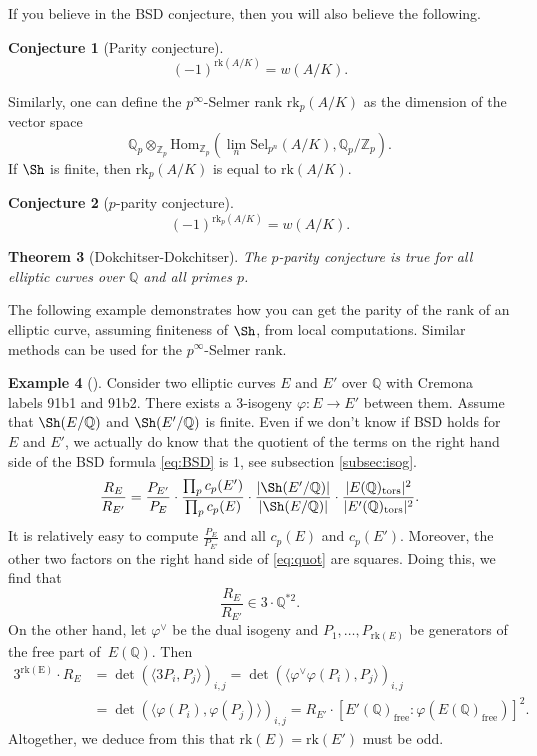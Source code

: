 \documentclass[12pt]{article}
\newtheorem{theorem}{Theorem}[section]
\newtheorem{conjecture}[theorem]{Conjecture}
\theoremstyle{definition}
\newtheorem{example}[theorem]{Example}
\numberwithin{equation}{subsection}
\newcommand{\Q}{\ensuremath{\mathbb{Q}}}
\newcommand{\Z}{\ensuremath{\mathbb{Z}}}
\begin{document}
If you believe in the BSD conjecture, then you will also believe the following.

\begin{conjecture}[Parity conjecture]
$$(-1)^{\mathrm{rk}(A/K)} = w(A/K).$$
\end{conjecture}

Similarly, one can define the $p^\infty$-Selmer rank $\mathrm{rk}_p(A/K)$ as the dimension of the vector space
$$ \Q_p \otimes_{\Z_p} \mathrm{Hom}_{\Z_p}\!\left( \lim_n \mathrm{Sel}_{p^n}(A/K), \Q_p/ \Z_p \right).$$
If $\Sh$ is finite, then $\mathrm{rk}_p(A/K)$ is equal to $\mathrm{rk}(A/K)$.

\begin{conjecture}[$p$-parity conjecture]
$$(-1)^{\mathrm{rk}_p(A/K)} = w(A/K).$$
\end{conjecture}

\begin{theorem}[Dokchitser-Dokchitser]
The $p$-parity conjecture is true for all elliptic curves over $\Q$ and all primes $p$.
\end{theorem}

The following example demonstrates how you can get the parity of the rank of an elliptic curve, assuming finiteness of $\Sh$, from local computations.
Similar methods can be used for the $p^\infty$-Selmer rank.

\begin{example}[\textrm{\cite[Subsect.~1.3]{DokchitserParity}}]
Consider two elliptic curves $E$ and $E'$ over $\Q$ with Cremona labels 91b1 and 91b2.
There exists a $3$-isogeny $\varphi \colon E \to E'$ between them.
Assume that $\Sh(E/\Q)$ and $\Sh(E'/\Q)$ is finite.
Even if we don't know if BSD holds for $E$ and $E'$, we actually do know that the quotient of the terms on the right hand side of the BSD formula \eqref{eq:BSD} is 1, see subsection \ref{subsec:isog}.
\begin{equation}\label{eq:quot}\frac{R_E}{R_{E'}} = \frac{P_{E'}}{P_E} \cdot \frac{\prod_p c_p(E')}{\prod_p c_p(E)} \cdot \frac{|\Sh(E'/\Q)|}{|\Sh(E/\Q)|} \cdot \frac{|E(\Q)_\mathrm{tors}|^2}{|E'(\Q)_\mathrm{tors}|^2}.\end{equation}
It is relatively easy to compute $\frac{P_E}{P_{E'}}$ and all $c_p(E)$ and $c_p(E')$.
Moreover, the other two factors on the right hand side of \eqref{eq:quot} are squares.
Doing this, we find that $$\frac{R_E}{R_{E'}} \in 3 \cdot \Q^{*2}.$$
On the other hand, let $\varphi^\vee$ be the dual isogeny and $P_1, \ldots, P_{\mathrm{rk}(E)}$ be generators of the free part of~$E(\Q)$.
Then
\begin{align*}
3^\mathrm{rk(E)} \cdot R_E &= \det\!\left(\langle 3P_i, P_j \rangle\right)_{i,j} = \det\!\left(\langle \varphi^\vee \varphi(P_i), P_j \rangle\right)_{i,j}\\ &= \det\!\left(\langle \varphi(P_i), \varphi(P_j) \rangle\right)_{i,j} = R_{E'} \cdot [E'(\Q)_{\mathrm{free}} : \varphi(E(\Q)_{\mathrm{free}})]^2.
\end{align*}
Altogether, we deduce from this that $\mathrm{rk}(E) = \mathrm{rk}(E')$ must be odd.
\end{example}
\end{document}
